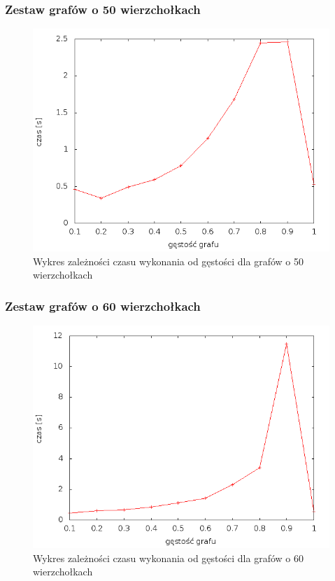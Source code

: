 \documentclass[12pt, a4paper]{article}
\begin{document}
\subsubsection*{Zestaw grafów o 50 wierzchołkach}
\begin{figure}[!h]
    \begin{center}
	\includegraphics[scale=0.5]{results/img/dim/dim_50.png}
	\caption{Wykres zależności czasu wykonania od gęstości dla grafów o 50 wierzchołkach}
    \end{center}
\end{figure}
\FloatBarrier
\subsubsection*{Zestaw grafów o 60 wierzchołkach}
\begin{figure}[!h]
    \begin{center}
	\includegraphics[scale=0.5]{results/img/dim/dim_60.png}
	\caption{Wykres zależności czasu wykonania od gęstości dla grafów o 60 wierzchołkach}
    \end{center}
\end{figure}
\FloatBarrier
\newpage
\end{document}
